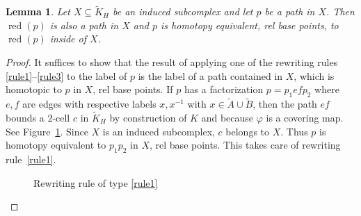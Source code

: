 \documentclass[11pt,reqno]{amsart}
\newtheorem{Lemma}[Thm]{Lemma}
\begin{document}
\begin{Lemma}\label{stayininduced}
Let $X\subseteq {\ensuremath{\widetilde {K}}}_H$ be an induced subcomplex and let $p$ be a path in $X$.  Then ${\mathop{\mathrm{red}}\nolimits}(p)$ is also a path in $X$ and $p$ is homotopy equivalent, rel base points, to ${\mathop{\mathrm{red}}\nolimits}(p)$ inside of $X$.
\end{Lemma}
\begin{proof}
It suffices to show that the result of applying one of the rewriting rules \eqref{rule1}--\eqref{rule3} to the label of $p$ is the label of a path contained in $X$, which is homotopic to $p$ in $X$, rel base points.  If $p$ has a factorization $p=p_1efp_2$ where $e,f$ are edges with respective labels $x,x{^{-1}}$ with $x\in {\ensuremath{\widetilde {A}}}\cup {\ensuremath{\widetilde {B}}}$, then the path $ef$ bounds a $2$-cell $c$ in ${\ensuremath{\widetilde {K}}}_H$ by construction of $K$ and because ${\varphi}$ is a covering map.  See Figure~\ref{figurerule1}.  Since $X$ is an induced subcomplex, $c$ belongs to $X$.  Thus $p$ is homotopy equivalent to $p_1p_2$ in $X$, rel base points.  This takes care of rewriting rule~\eqref{rule1}.

\begin{figure}[bt]
\begin{center}
\end{center}
\caption{Rewriting rule of type \eqref{rule1}\label{figurerule1}}
\end{figure}


\end{proof}
\end{document}

